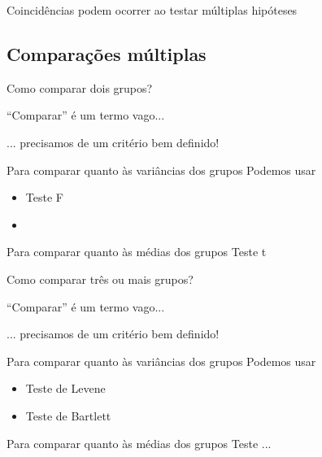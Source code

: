 \documentclass{beamer}
\begin{document}
\begin{frame}
  \begin{center}
    Coincidências podem ocorrer ao testar múltiplas hipóteses
  \end{center}
\end{frame}

\subsection{Comparações múltiplas}

\begin{frame}{\small Como comparar dois grupos?}
  \begin{center}
    \small
    ``Comparar'' é um termo vago...

    \bigskip
    ... precisamos de um critério bem definido!
  \end{center}
  \bigskip
  \begin{block}{Para comparar quanto às variâncias dos grupos}
    Podemos usar
    \begin{itemize}
      \small
    \item Teste F
    \item<0>
    \end{itemize}
  \end{block}
  \bigskip
  \begin{block}{Para comparar quanto às médias dos grupos}
    Teste t
  \end{block}
\end{frame}

\begin{frame}{\small Como comparar três ou mais grupos?}
  \begin{center}
    \small
    ``Comparar'' é um termo vago...

    \bigskip
    ... precisamos de um critério bem definido!
  \end{center}
  \bigskip
  \begin{block}{Para comparar quanto às variâncias dos grupos}
    Podemos usar
    \begin{itemize}
      \small
    \item Teste de Levene
    \item Teste de Bartlett
    \end{itemize}
  \end{block}
  \bigskip
  \begin{block}{Para comparar quanto às médias dos grupos}
    Teste ...
  \end{block}
\end{frame}
  
\end{document}
